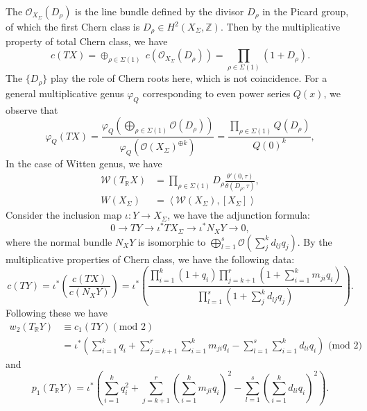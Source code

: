 \documentclass[11pt]{article}
\newcommand{\reals}{\mathbb R}
\newcommand{\intg}{\mathbb Z}
\begin{document}
The $\mathcal{O}_{X_\Sigma}(D_\rho)$ is the line bundle defined by the divisor $D_\rho$ in the Picard group, of which the first Chern class is $D_\rho\in H^2(X_\Sigma,\intg)$.
Then by the multiplicative property of total Chern class, we have
\begin{equation*}
	c(TX)=\oplus_{\rho\in\Sigma(1)}\  c(\mathcal{O}_{X_\Sigma}(D_\rho))=\prod_{\rho\in \Sigma(1)}(1+D_\rho).
\end{equation*}
The $\{D_\rho\}$ play the role of Chern roots here, which is not coincidence.
For a general multiplicative genus $\varphi_Q$ corresponding to even power series $Q(x)$, we observe that
\begin{equation*}
\varphi_Q(TX)=\frac{\varphi_Q\left(\bigoplus_{\rho\in \Sigma(1)}\mathcal{O}(D_\rho)\right)}{\varphi_Q(\mathcal{O}(X_\Sigma)^{\oplus k})}=\frac{\prod_{\rho\in \Sigma(1)} Q(D_\rho)}{Q(0)^k},
\end{equation*}
In the case of Witten genus, we have
\begin{equation*}
\begin{aligned}
\mathcal{W}(T_\reals X)&=\prod_{\rho\in \Sigma(1)}D_\rho \frac{\theta'(0,\tau)}{\theta(D_\rho,\tau)},\\
W(X_\Sigma)&=\left\langle\mathcal{W}(X_\Sigma),[X_\Sigma]\right\rangle
\end{aligned}
\end{equation*}
Consider the inclusion map $\iota: Y\rightarrow X_\Sigma$, we have the adjunction formula:
$$
0\longrightarrow TY\longrightarrow\iota^*TX_{\Sigma}\longrightarrow\iota^* N_X Y\longrightarrow0,
$$
where the normal bundle $N_X Y$ is isomorphic to $\bigoplus_{l=1}^s\mathcal{O}(\sum_{j}^k d_{l j} q_j)$.
By the multiplicative properties of Chern class, we have the following data:
\begin{equation*}
c(TY)=\iota^*\left(\frac{c(TX)}{c(N_X Y)}\right)=\iota^*\left(\frac{\prod_{i=1}^k (1+q_i)\prod_{j=k+1}^{r}(1+\sum_{i=1}^k m_{ji}q_i)}{\prod_{l=1}^s(1+\sum_{j}^k d_{l j} q_j)}\right).
\end{equation*}
Following these we have
$$
\begin{aligned}
w_2(T_\mathbb{R}Y)& \equiv c_1(TY) (\text{mod } 2)\\
& =\iota^*\left(\sum_{i=1}^k q_i+\sum_{j=k+1}^{r} \sum_{i=1}^k m_{ji}q_i-\sum_{l=1}^s\sum_{i=1}^k d_{l i}q_i\right) \text{     (mod } 2)
\end{aligned}
$$
and 
$$
p_1(T_{\mathbb{R}}Y)=\iota^*\left(\sum_{i=1}^k q_i^2+\sum_{j=k+1}^r (\sum_{i=1}^k m_{ji}q_i)^2-\sum_{l=1}^s(\sum_{i=1}^k d_{l i}q_i)^2\right).
$$
\end{document}
